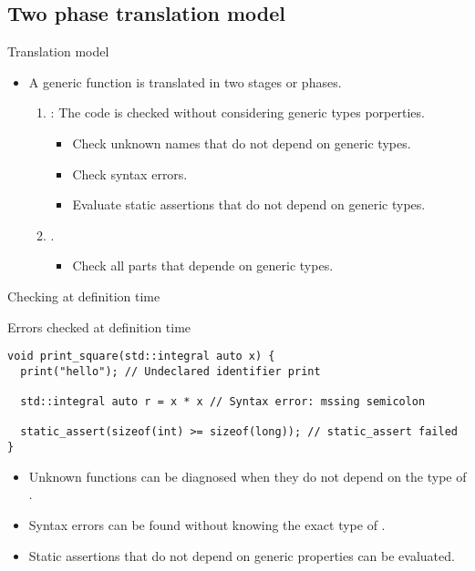 \subsection{Two phase translation model}

\begin{frame}[t,fragile]{Translation model}
\begin{itemize}
  \item A generic function is translated in two stages or phases.

  \begin{enumerate}

    \item {}:
          The code is checked without considering generic types porperties.
      \begin{itemize}
        \item Check unknown names that do not depend on generic types.
        \item Check syntax errors.
        \item Evaluate static assertions that do not depend on generic types.
      \end{itemize}
    

    \item {}.
      \begin{itemize}
        \item Check all parts that depende on generic types.
      \end{itemize}

  \end{enumerate}
\end{itemize}
\end{frame}

\begin{frame}[t,fragile]{Checking at definition time}
\begin{block}{Errors checked at definition time}
\begin{lstlisting}
void print_square(std::integral auto x) {
  print("hello"); // Undeclared identifier print

  std::integral auto r = x * x // Syntax error: mssing semicolon

  static_assert(sizeof(int) >= sizeof(long)); // static_assert failed
}
\end{lstlisting}
\end{block}

  \begin{itemize}
    \item Unknown functions can be diagnosed when they do not depend on the type of .

    \item Syntax errors can be found without knowing the exact type of .

    \item Static assertions that do not depend on generic properties can be evaluated.
  \end{itemize}
\end{frame}

